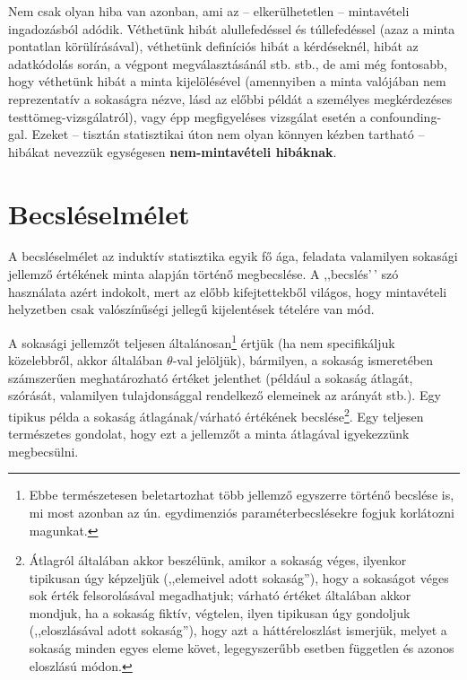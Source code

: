 \documentclass[
]{book}
\begin{document}
Nem csak olyan hiba van azonban, ami az -- elkerülhetetlen -- mintavételi ingadozásból adódik. Véthetünk hibát alullefedéssel és túllefedéssel (azaz a minta pontatlan körülírásával), véthetünk definíciós hibát a kérdéseknél, hibát az adatkódolás során, a végpont megválasztásánál stb. stb., de ami még fontosabb, hogy véthetünk hibát a minta kijelölésével (amennyiben a minta valójában nem reprezentatív a sokaságra nézve, lásd az előbbi példát a személyes megkérdezéses testtömeg-vizsgálatról), vagy épp megfigyeléses vizsgálat esetén a confounding-gal. Ezeket -- tisztán statisztikai úton nem olyan könnyen kézben tartható -- hibákat nevezzük egységesen \textbf{nem-mintavételi hibáknak}.

\hypertarget{induktivbecsleselmelet}{%
\section{Becsléselmélet}\label{induktivbecsleselmelet}}

A becsléselmélet az induktív statisztika egyik fő ága, feladata valamilyen sokasági jellemző értékének minta alapján történő megbecslése. A ,,becslés'\,' szó használata azért indokolt, mert az előbb kifejtettekből világos, hogy mintavételi helyzetben csak valószínűségi jellegű kijelentések tételére van mód.

A sokasági jellemzőt teljesen általánosan\footnote{Ebbe természetesen beletartozhat több jellemző egyszerre történő becslése is, mi most azonban az ún. egydimenziós paraméterbecslésekre fogjuk korlátozni magunkat.} értjük (ha nem specifikáljuk közelebbről, akkor általában \(\theta\)-val jelöljük), bármilyen, a sokaság ismeretében számszerűen meghatározható értéket jelenthet (például a sokaság átlagát, szórását, valamilyen tulajdonsággal rendelkező elemeinek az arányát stb.). Egy tipikus példa a sokaság átlagának/várható értékének becslése\footnote{Átlagról általában akkor beszélünk, amikor a sokaság véges, ilyenkor tipikusan úgy képzeljük (,,elemeivel adott sokaság''), hogy a sokaságot véges sok érték felsorolásával megadhatjuk; várható értéket általában akkor mondjuk, ha a sokaság fiktív, végtelen, ilyen tipikusan úgy gondoljuk (,,eloszlásával adott sokaság''), hogy azt a háttéreloszlást ismerjük, melyet a sokaság minden egyes eleme követ, legegyszerűbb esetben független és azonos eloszlású módon.}. Egy teljesen természetes gondolat, hogy ezt a jellemzőt a minta átlagával igyekezzünk megbecsülni.
\end{document}

